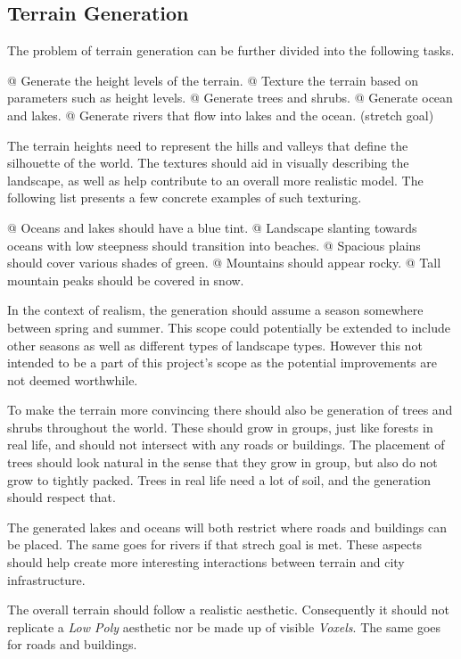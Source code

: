 \subsection{Terrain Generation}

The problem of terrain generation can be further divided into the following tasks.
\begin{easylist}
  @ Generate the height levels of the terrain.
  @ Texture the terrain based on parameters such as height levels.
  @ Generate trees and shrubs.
  @ Generate ocean and lakes.
  @ Generate rivers that flow into lakes and the ocean. (stretch goal)
\end{easylist}

The terrain heights need to represent the hills and valleys that define the silhouette of the world.
The textures should aid in visually describing the landscape, as well as help contribute to an overall more realistic model.
The following list presents a few concrete examples of such texturing.
\begin{easylist}
  @ Oceans and lakes should have a blue tint.
  @ Landscape slanting towards oceans with low steepness should transition into beaches.
  @ Spacious plains should cover various shades of green.
  @ Mountains should appear rocky.
  @ Tall mountain peaks should be covered in snow.
\end{easylist}

In the context of realism, the generation should assume a season somewhere between spring and summer.
This scope could potentially be extended to include other seasons as well as different types of landscape types.
However this not intended to be a part of this project's scope as the potential improvements are not deemed worthwhile.

To make the terrain more convincing there should also be generation of trees and shrubs throughout the world.
These should grow in groups, just like forests in real life, and should not intersect with any roads or buildings.
The placement of trees should look natural in the sense that they grow in group, but also do not grow to tightly packed.
Trees in real life need a lot of soil, and the generation should respect that.

The generated lakes and oceans will both restrict where roads and buildings can be placed.
The same goes for rivers if that strech goal is met.
These aspects should help create more interesting interactions between terrain and city infrastructure.

The overall terrain should follow a realistic aesthetic.
Consequently it should not replicate a \textit{Low Poly} aesthetic nor be made up of visible \textit{Voxels}.
The same goes for roads and buildings.